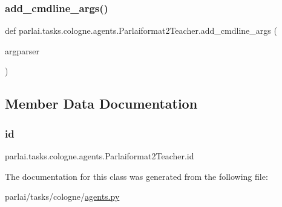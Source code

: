 \subsubsection{\texorpdfstring{add\+\_\+cmdline\+\_\+args()}{add\_cmdline\_args()}}
{\footnotesize\ttfamily def parlai.\+tasks.\+cologne.\+agents.\+Parlaiformat2\+Teacher.\+add\+\_\+cmdline\+\_\+args (\begin{DoxyParamCaption}\item[{}]{argparser }\end{DoxyParamCaption})\hspace{0.3cm}{\ttfamily [static]}}



\subsection{Member Data Documentation}
\mbox{\label{classparlai_1_1tasks_1_1cologne_1_1agents_1_1Parlaiformat2Teacher_a1d6efc35132bbec962c47ae5797ce329}} 
\subsubsection{\texorpdfstring{id}{id}}
{\footnotesize\ttfamily parlai.\+tasks.\+cologne.\+agents.\+Parlaiformat2\+Teacher.\+id}



The documentation for this class was generated from the following file\+:\begin{DoxyCompactItemize}
\item 
parlai/tasks/cologne/\hyperlink{parlai_2tasks_2cologne_2agents_8py}{agents.\+py}\end{DoxyCompactItemize}
